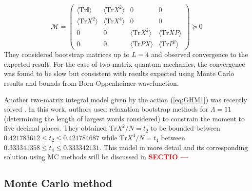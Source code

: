 \documentclass[11pt]{article}
\newcommand{\TODO}[1]{\textcolor{red}{{\bf #1}}}
\begin{document}
\begin{equation}
	\mathcal{M} = 
	\begin{pmatrix}
		\langle \mbox{Tr}\mathbb{I} \rangle & \langle \mbox{Tr} X^2 \rangle & 0 & 0 \\
		\langle \mbox{Tr} X^2 \rangle & \langle \mbox{Tr} X^4 \rangle  & 0 & 0 \\ 
		0 & 0 & \langle \mbox{Tr} X^2 \rangle & \langle \mbox{Tr} XP \rangle \\
		0 & 0  & \langle \mbox{Tr} PX \rangle & \langle \mbox{Tr} P^2 \rangle
	\end{pmatrix}  \succeq 0
\end{equation}
They considered bootstrap matrices up to $L=4$ and observed
convergence to the expected result. 
For the case of two-matrix quantum mechanics, the convergence
was found to be slow but consistent with results expected using 
Monte Carlo results and bounds from Born-Oppenheimer wavefunction. 

Another two-matrix integral model given by the action 
(\ref{eq:GHM1}) was recently solved \cite{Kazakov:2021lel}. 
In this work, authors used relaxation bootstrap methods for 
$\Lambda=11$ (determining the length of largest words considered)
to constrain the moment to five decimal places. They obtained $\mathrm{Tr}X^2/N = t_2$ 
to be bounded between $ 0.421783612 \le t_2 \le 0.421784687$ while $\mathrm{Tr}X^4/N = t_4$ 
between $0.333341358 \le t_4 \le 0.333342131$.
This model in more detail 
and its corresponding solution using MC methods will be discussed in 
\TODO{SECTIO ---}



\subsection{Monte Carlo method}
\end{document}
